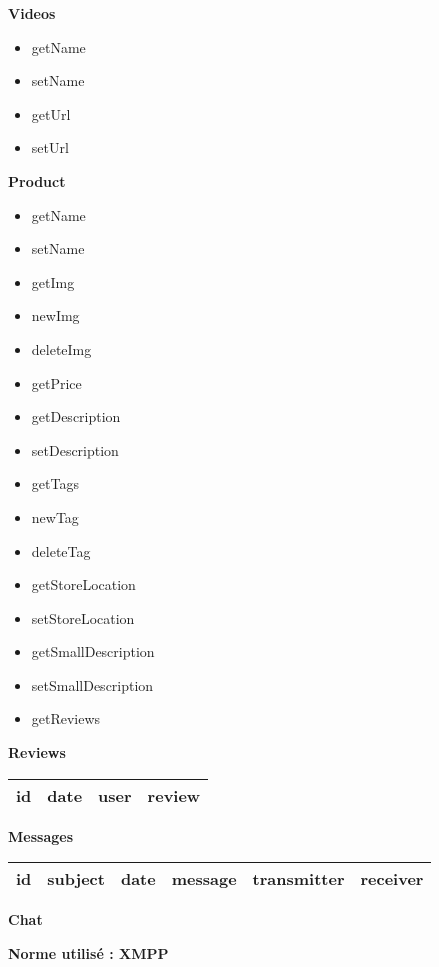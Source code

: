 \documentclass{article}
\begin{document}
\Large{\textbf{Videos}}

\begin{large}
\begin{itemize}
\item getName
\item setName
\item getUrl
\item setUrl
\end{itemize}
\end{large}


\Large{\textbf{Product}}

\begin{large}
\begin{itemize}
\item getName
\item setName
\item getImg
\item newImg
\item deleteImg
\item getPrice
\item getDescription
\item setDescription
\item getTags
\item newTag
\item deleteTag
\item getStoreLocation
\item setStoreLocation
\item getSmallDescription
\item setSmallDescription
\item getReviews
\end{itemize}
\end{large}


\Large{\textbf{Reviews}}
\vspace{0.5cm}

\begin{large}

\begin{tabular}{|l|l|l|l|}
  \hline
  id & date & user & review \\
  \hline
\end{tabular}
\vspace{0.5cm}
\end{large}

\Large{\textbf{Messages}}
\vspace{0.5cm}

\begin{large}

\begin{tabular}{|l|l|l|l|l|l|}
  \hline
  id & subject & date & message & transmitter & receiver \\
  \hline
\end{tabular}
\vspace{0.5cm}
\end{large}

\Large{\textbf{Chat}}
\vspace{0.5cm}


\begin{large}
\textbf{Norme utilisé : XMPP}

\end{large}
\end{document}
